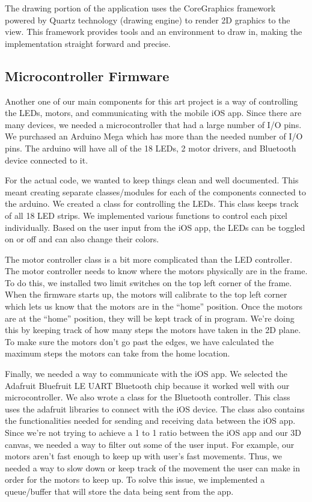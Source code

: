 \documentclass[12pt]{article}
\begin{document}
The drawing portion of the application uses the CoreGraphics framework powered by Quartz technology (drawing engine) to render 2D graphics to the view. This framework provides tools and an environment to draw in, making the implementation straight forward and precise.

\subsection{Microcontroller Firmware}
Another one of our main components for this art project is a way of controlling the LEDs, motors, and communicating with the mobile iOS app. Since there are many devices, we needed a microcontroller that had a large number of I/O pins. We purchased an Arduino Mega which has more than the needed number of I/O pins. The arduino will have all of the 18 LEDs, 2 motor drivers, and Bluetooth device connected to it.

For the actual code, we wanted to keep things clean and well documented. This meant creating separate classes/modules for each of the components connected to the arduino. We created a class for controlling the LEDs. This class keeps track of all 18 LED strips. We implemented various functions to control each pixel individually. Based on the user input from the iOS app, the LEDs can be toggled on or off and can also change their colors.

The motor controller class is a bit more complicated than the LED controller. The motor controller needs to know where the motors physically are in the frame. To do this, we installed two limit switches on the top left corner of the frame. When the firmware starts up, the motors will calibrate to the top left corner which lets us know that the motors are in the “home” position. Once the motors are at the “home” position, they will be kept track of in program. We’re doing this by keeping track of how many steps the motors have taken in the 2D plane. To make sure the motors don’t go past the edges, we have calculated the maximum steps the motors can take from the home location. 

Finally, we needed a way to communicate with the iOS app. We selected the Adafruit Bluefruit LE UART Bluetooth chip because it worked well with our microcontroller. We also wrote a class for the Bluetooth controller. This class uses the adafruit libraries to connect with the iOS device. The class also contains the functionalities needed for sending and receiving data between the iOS app. Since we’re not trying to achieve a 1 to 1 ratio between the iOS app and our 3D canvas, we needed a way to filter out some of the user input. For example, our motors aren’t fast enough to keep up with user’s fast movements. Thus, we needed a way to slow down or keep track of the movement the user can make in order for the motors to keep up. To solve this issue, we implemented a queue/buffer that will store the data being sent from the app.
\end{document}
